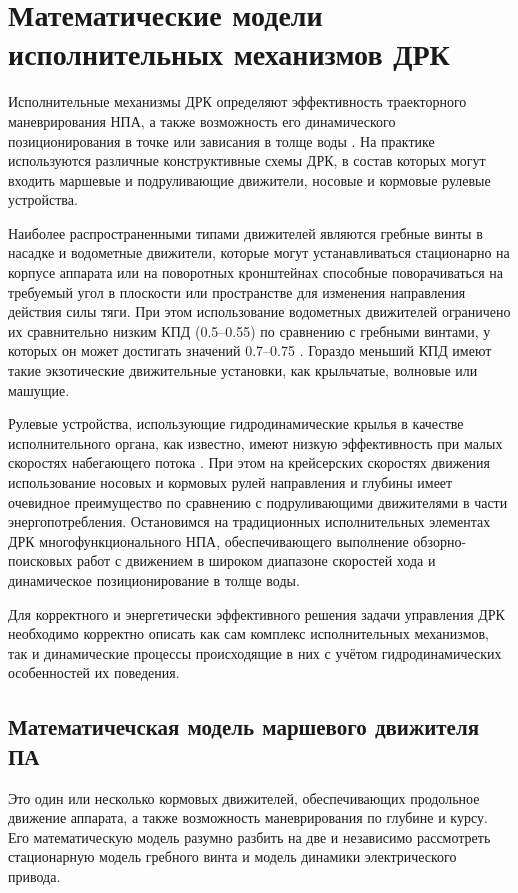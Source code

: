 \chapter{Математические модели исполнительных механизмов ДРК}\label{ch:Propulsion}

Исполнительные механизмы ДРК определяют эффективность траекторного маневрирования НПА, а также возможность его динамического позиционирования в точке или зависания в толще воды \cite{костенко2017оценка}.
На практике используются различные конструктивные схемы ДРК, в состав которых могут входить маршевые и подруливающие движители, носовые и кормовые рулевые устройства.

Наиболее распространенными типами движителей являются гребные винты в насадке и водометные движители, которые могут устанавливаться стационарно на корпусе аппарата или на поворотных кронштейнах способные поворачиваться на требуемый угол в плоскости или пространстве для изменения направления действия силы тяги.
При этом использование водометных движителей ограничено их сравнительно низким КПД (0.5–0.55) по сравнению с гребными винтами, у которых он может достигать значений 0.7–0.75 \cite{инзарцев2018подводные}. Гораздо меньший КПД имеют такие экзотические движительные установки, как крыльчатые, волновые или машущие. 

Рулевые устройства, использующие гидродинамические крылья в качестве исполнительного органа, как известно, имеют низкую эффективность при малых скоростях набегающего потока \cite{агеев2015авто}.
При этом на крейсерских скоростях движения использование носовых и кормовых рулей направления и глубины имеет очевидное преимущество по сравнению с подруливающими движителями в части энергопотребления.
Остановимся на традиционных исполнительных элементах ДРК многофункционального НПА, обеспечивающего выполнение обзорно-поисковых работ с движением в широком диапазоне скоростей хода и динамическое позиционирование в толще воды.

Для корректного и энергетически эффективного решения задачи управления ДРК необходимо корректно описать как сам комплекс исполнительных механизмов, так и динамические процессы происходящие в них с учётом гидродинамических особенностей их поведения.

\section{Математичечская модель маршевого движителя ПА}

Это один или несколько кормовых движителей, обеспечивающих продольное движение аппарата, а также возможность маневрирования по глубине и курсу.
Его математическую модель разумно разбить на две и независимо рассмотреть стационарную модель гребного винта и модель динамики электрического привода.

